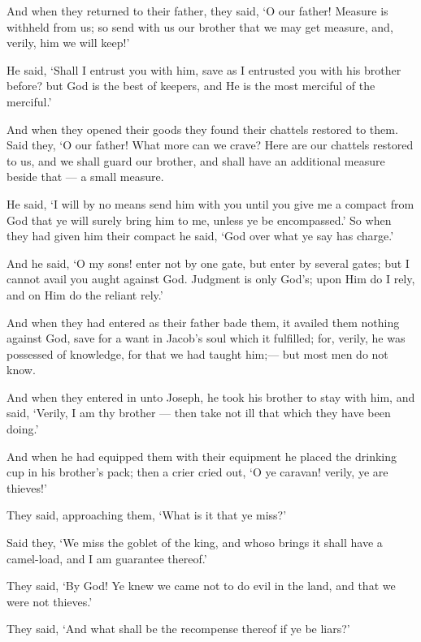 \documentclass[fontsize=14pt, letterpaper, notitlepage, openany, DIV=12]{scrbook} %
\begin{document}
\noindent[12:63]
And when they returned to their father, they said, `O our father! Measure is withheld
from us; so send with us our brother that we may get measure, and, verily, him we will keep!'

\noindent[12:64]
He said, `Shall I entrust you with him, save as I entrusted you with his brother before?
but God is the best of keepers, and He is the most merciful of the merciful.'

\noindent[12:65]
And when they opened their goods they found their chattels restored to them. Said they,
`O our father! What more can we crave? Here are our chattels restored to us, and we shall guard
our brother, and shall have an additional measure beside that --- a small measure.

\noindent[12:66]
He said, `I will by no means send him with you until you give me a compact from God
that ye will surely bring him to me, unless ye be encompassed.' So when they had given him
their compact he said, `God over what ye say has charge.'

\noindent[12:67]
And he said, `O my sons! enter not by one gate, but enter by several gates; but I cannot
avail you aught against God. Judgment is only God's; upon Him do I rely, and on Him do the
reliant rely.'

\noindent[12:68]
And when they had entered as their father bade them, it availed them nothing against
God, save for a want in Jacob's soul which it fulfilled; for, verily, he was possessed of
knowledge, for that we had taught him;--- but most men do not know.

\noindent[12:69]
And when they entered in unto Joseph, he took his brother to stay with him, and said,
`Verily, I am thy brother --- then take not ill that which they have been doing.'

\noindent[12:70]
And when he had equipped them with their equipment he placed the drinking cup in his
brother's pack; then a crier cried out, `O ye caravan! verily, ye are thieves!'

\noindent[12:71]
They said, approaching them, `What is it that ye miss?'

\noindent[12:72]
Said they, `We miss the goblet of the king, and whoso brings it shall have a camel-load,
and I am guarantee thereof.'

\noindent[12:73]
They said, `By God! Ye knew we came not to do evil in the land, and that we were not
thieves.'

\noindent[12:74]
They said, `And what shall be the recompense thereof if ye be liars?'
\end{document}
